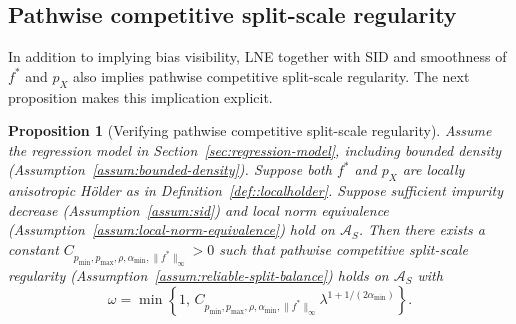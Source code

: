 \documentclass[11pt]{article}
\theoremstyle{plain}
\newtheorem{proposition}[theorem]{Proposition}
\theoremstyle{definition}
\theoremstyle{remark}
\theoremstyle{plain}
\newcommand{\1}{\mathbbm{1}}
\begin{document}

\subsection{Pathwise competitive split-scale regularity}
\label{sec::examplessplit}

In addition to implying bias visibility, LNE together with SID and smoothness of $f^*$ and $p_X$ also implies pathwise competitive split-scale regularity.
The next proposition makes this implication explicit.

\begin{proposition}[Verifying pathwise competitive split-scale regularity]
\label{prop:pathwise-split-scale-from-primitives}
Assume the regression model in Section~\ref{sec:regression-model}, including bounded density (Assumption~\ref{assum:bounded-density}).
Suppose both $f^*$ and $p_X$ are locally anisotropic H\"older as in Definition~\ref{def::localholder}. 
Suppose sufficient impurity decrease (Assumption~\ref{assum:sid}) and local norm equivalence (Assumption~\ref{assum:local-norm-equivalence}) hold on $\mathcal A_S$.
Then there exists a constant
$C_{p_{\min},p_{\max},\rho,\alpha_{\min},\|f^*\|_\infty}>0$ such that
pathwise competitive split-scale regularity (Assumption~\ref{assum:reliable-split-balance}) holds on $\mathcal A_S$ with
\[
\omega
=
\min\left\{1,\,
C_{p_{\min},p_{\max},\rho,\alpha_{\min},\|f^*\|_\infty}
\lambda^{1+1/(2\alpha_{\min})}
\right\}.
\]
\end{proposition}

\end{document}
